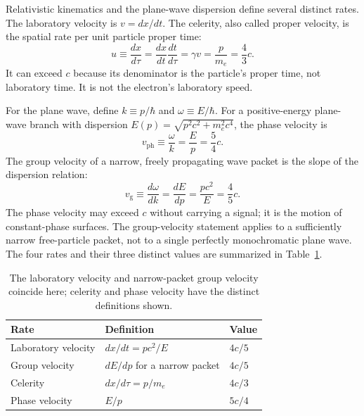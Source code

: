 \documentclass[12pt]{article}
\begin{document}
Relativistic kinematics and the plane-wave dispersion define several distinct rates. The laboratory velocity is $v=dx/dt$. The celerity, also called proper velocity, is the spatial rate per unit particle proper time:
\begin{equation}
  u\equiv\frac{dx}{d\tau}
  =\frac{dx}{dt}\frac{dt}{d\tau}
  =\gamma v
  =\frac{p}{m_e}
  =\frac{4}{3}c.
  \label{eq:celerity}
\end{equation}
It can exceed $c$ because its denominator is the particle's proper time, not laboratory time. It is not the electron's laboratory speed.

For the plane wave, define $k\equiv p/\hbar$ and $\omega\equiv E/\hbar$.
For a positive-energy plane-wave branch with dispersion $E(p)=\sqrt{p^2c^2+m_e^2c^4}$, the phase velocity is
\begin{equation}
  v_{\mathrm{ph}}\equiv\frac{\omega}{k}=\frac{E}{p}=\frac{5}{4}c.
  \label{eq:phase-velocity}
\end{equation}
The group velocity of a narrow, freely propagating wave packet is the slope of the dispersion relation:
\begin{equation}
  v_{\mathrm{g}}\equiv\frac{d\omega}{dk}
  =\frac{dE}{dp}
  =\frac{pc^2}{E}
  =\frac{4}{5}c.
  \label{eq:group-velocity}
\end{equation}
The phase velocity may exceed $c$ without carrying a signal; it is the motion of constant-phase surfaces. The group-velocity statement applies to a sufficiently narrow free-particle packet, not to a single perfectly monochromatic plane wave. The four rates and their three distinct values are summarized in Table~\ref{tab:rates}.

\begin{table}[ht]
  \centering
  \small
  \begin{tabular}{@{}lll@{}}
    \toprule
    Rate & Definition & Value \\
    \midrule
    Laboratory velocity & $dx/dt=pc^2/E$ & $4c/5$ \\
    Group velocity & $dE/dp$ for a narrow packet & $4c/5$ \\
    Celerity & $dx/d\tau=p/m_e$ & $4c/3$ \\
    Phase velocity & $E/p$ & $5c/4$ \\
    \bottomrule
  \end{tabular}
  \caption{The laboratory velocity and narrow-packet group velocity coincide here; celerity and phase velocity have the distinct definitions shown.}
  \label{tab:rates}
\end{table}
\end{document}
